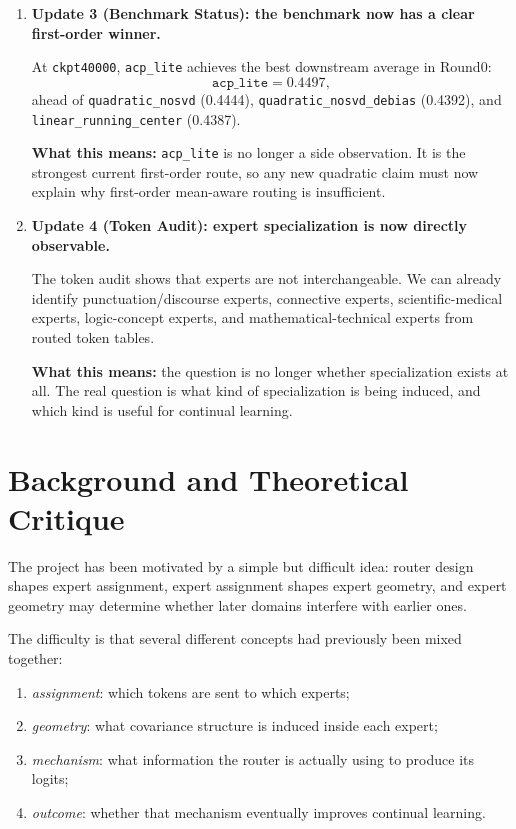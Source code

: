 \documentclass[11pt]{article}
\begin{document}
\begin{enumerate}
    \textbf{What this means:} the current checkpoint still does not support a strong claim that routing decisions are already dominated by variance structure. The mathematically cleaner target form is
    \[
    \ell_e(x)=x_c^\top Q_e x_c+b_e
    \]
    or, in low-rank form,
    \[
    \ell_e(x)=\|V_e x_c\|_2^2+b_e.
    \]

    \item \textbf{Update 3 (Benchmark Status): the benchmark now has a clear first-order winner.}

    At \texttt{ckpt40000}, \texttt{acp\_lite} achieves the best downstream average in Round0:
    \[
    \texttt{acp\_lite} = 0.4497,
    \]
    ahead of \texttt{quadratic\_nosvd} (0.4444), \texttt{quadratic\_nosvd\_debias} (0.4392), and \texttt{linear\_running\_center} (0.4387).

    \textbf{What this means:} \texttt{acp\_lite} is no longer a side observation. It is the strongest current first-order route, so any new quadratic claim must now explain why first-order mean-aware routing is insufficient.

    \item \textbf{Update 4 (Token Audit): expert specialization is now directly observable.}

    The token audit shows that experts are not interchangeable. We can already identify punctuation/discourse experts, connective experts, scientific-medical experts, logic-concept experts, and mathematical-technical experts from routed token tables.

    \textbf{What this means:} the question is no longer whether specialization exists at all. The real question is what kind of specialization is being induced, and which kind is useful for continual learning.
\end{enumerate}

\section{Background and Theoretical Critique}

The project has been motivated by a simple but difficult idea: router design shapes expert assignment, expert assignment shapes expert geometry, and expert geometry may determine whether later domains interfere with earlier ones.

The difficulty is that several different concepts had previously been mixed together:
\begin{enumerate}
    \item \emph{assignment}: which tokens are sent to which experts;
    \item \emph{geometry}: what covariance structure is induced inside each expert;
    \item \emph{mechanism}: what information the router is actually using to produce its logits;
    \item \emph{outcome}: whether that mechanism eventually improves continual learning.
\end{enumerate}
\end{document}
